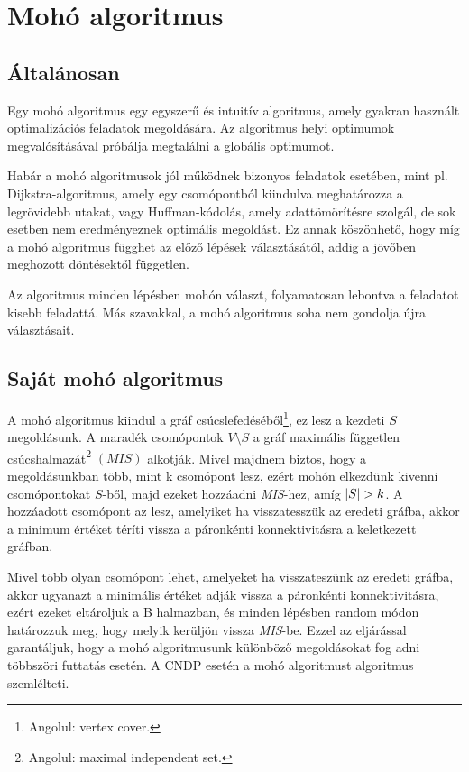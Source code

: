 \section{Mohó algoritmus}\label{sec:MOHO_ALGORITMUS}

\subsection{Általánosan}
Egy mohó algoritmus egy egyszerű és intuitív algoritmus, amely gyakran használt
optimalizációs feladatok megoldására. Az algoritmus helyi optimumok megvalósításával próbálja
megtalálni a globális optimumot.

Habár a mohó algoritmusok jól működnek bizonyos feladatok esetében,
mint pl. Dijkstra-algoritmus, amely egy csomópontból kiindulva meghatározza a legrövidebb utakat,
vagy Huffman-kódolás, amely adattömörítésre szolgál, de sok esetben nem eredményeznek optimális megoldást.
Ez annak köszönhető, hogy míg a mohó algoritmus függhet az előző lépések választásától,
addig a jövőben meghozott döntésektől független.

Az algoritmus minden lépésben mohón választ, folyamatosan lebontva a feladatot kisebb feladattá.
Más szavakkal, a mohó algoritmus soha nem gondolja újra választásait.

\subsection{Saját mohó algoritmus}
A mohó algoritmus kiindul a gráf csúcslefedéséből\footnote{ Angolul: vertex cover.}, ez lesz a kezdeti $S$ megoldásunk.
A maradék csomópontok $V \setminus S$  a gráf maximális független csúcshalmazát\footnote{ Angolul: maximal independent set.} $\left( \textit{MIS} \right)$ alkotják.
Mivel majdnem biztos, hogy a megoldásunkban több, mint k csomópont lesz, ezért mohón elkezdünk kivenni csomópontokat $S$-ből,
majd ezeket hozzáadni \emph{MIS}-hez, amíg $\lvert S\rvert > k$.
A hozzáadott csomópont az lesz, amelyiket ha visszatesszük az eredeti gráfba,
akkor a minimum értéket téríti vissza a páronkénti konnektivitásra a keletkezett gráfban.

Mivel több olyan csomópont lehet, amelyeket ha visszateszünk az eredeti gráfba,
akkor ugyanazt a minimális értéket adják vissza a páronkénti konnektivitásra,
ezért ezeket eltároljuk a B halmazban, és minden lépésben random módon határozzuk meg,
hogy melyik kerüljön vissza \emph{MIS}-be. Ezzel az eljárással garantáljuk,
hogy a mohó algoritmusunk különböző megoldásokat fog adni többszöri futtatás esetén.
A CNDP esetén a mohó algoritmust  algoritmus szemlélteti.


